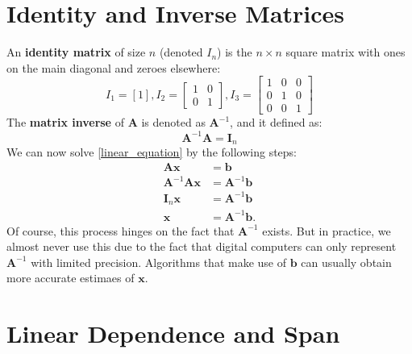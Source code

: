 \documentclass[11pt,twocolumn]{report}
\begin{document}
\section{Identity and Inverse Matrices}
An \textbf{identity matrix} of size $n$ (denoted $I_n$)
is the $n \times n$ square matrix with ones on the main diagonal and
zeroes elsewhere:
\begin{equation*}
  I_1 = [1],
  I_2 = \begin{bmatrix}
    1 & 0\\
    0 & 1
  \end{bmatrix},
  I_3 = \begin{bmatrix}
    1 & 0 & 0\\
    0 & 1 & 0\\
    0 & 0 & 1
  \end{bmatrix}
\end{equation*}
The \textbf{matrix inverse} of $\bm{A}$ is denoted as $\bm{A}^{-1}$, and it defined as:
\begin{equation}
  \bm{A}^{-1}\bm{A} = \bm{I}_n
\end{equation}
We can now solve \ref{linear_equation} by the following steps:
\begin{align}
  \bm{Ax} & = \bm{b}\\
  \bm{A}^{-1}\bm{Ax} & = \bm{A}^{-1}\bm{b}\\
  \bm{I}_n\bm{x} & = \bm{A}^{-1}\bm{b}\\
  \bm{x} & = \bm{A}^{-1}\bm{b}.
\end{align}
Of course, this process hinges on the fact that $\bm{A}^{-1}$ exists.
But in practice, we almost never use this due to the fact that digital
computers can only represent $\bm{A}^{-1}$ with limited precision. Algorithms
that make use of $\bm{b}$ can usually obtain more accurate estimaes of
$\bm{x}$.

\section{Linear Dependence and Span}
\end{document}
